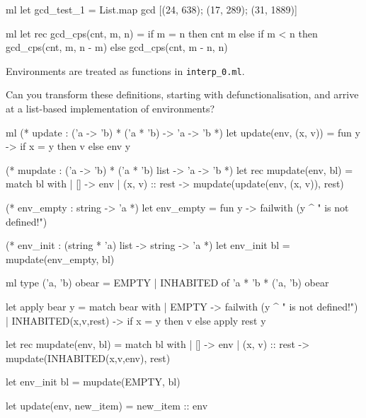 \documentclass{supervision}
\begin{document}
\begin{questions}
\begin{code}{ml}
        let gcd_test_1 = List.map gcd [(24, 638); (17, 289); (31, 1889)]
      \end{code}
      \begin{solution}
        \begin{code}{ml}
          let rec gcd_cps(cnt, m, n) =
              if m = n
              then cnt m
              else if m < n
                  then gcd_cps(cnt, m, n - m)
                  else gcd_cps(cnt, m - n, n)
        \end{code}
      \end{solution}

    \question Environments are treated as functions in \lstinline|interp_0.ml|.

      Can you transform these definitions, starting with defunctionalisation,
      and arrive at a list-based implementation of environments?

      \begin{code}{ml}
        (* update : ('a -> 'b) * ('a * 'b) -> 'a -> 'b *)
        let update(env, (x, v)) = fun y -> if x = y then v else env y

        (* mupdate : ('a -> 'b) * ('a * 'b) list -> 'a -> 'b *)
        let rec mupdate(env, bl) =
            match bl with
            | [] -> env
            | (x, v) :: rest -> mupdate(update(env, (x, v)), rest)

        (* env_empty : string -> 'a *)
        let env_empty = fun y -> failwith (y ^ " is not defined!\n")

        (* env_init : (string * 'a) list -> string -> 'a *)
        let env_init bl = mupdate(env_empty, bl)
      \end{code}
      \begin{solution}
        \begin{code}{ml}
          type ('a, 'b) obear = EMPTY | INHABITED of 'a * 'b * ('a, 'b) obear

          let apply bear y =
              match bear with
              | EMPTY -> failwith (y ^ " is not defined!\n")
              | INHABITED(x,v,rest) -> if x = y then v else apply rest y

          let rec mupdate(env, bl) =
              match bl with
              | [] -> env
              | (x, v) :: rest -> mupdate(INHABITED(x,v,env), rest)

          let env_init bl = mupdate(EMPTY, bl)





          let update(env, new_item) = new_item :: env


\end{code}
\end{solution}
\end{questions}
\end{document}
